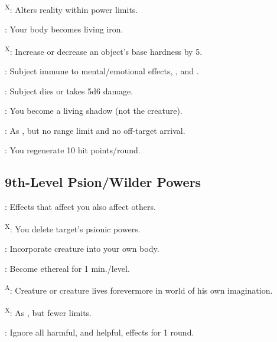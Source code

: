 \textsuperscript{X}: Alters reality within power limits.

: Your body becomes living iron.

\textsuperscript{X}: Increase or decrease an object's base hardness by 5.

: Subject immune to mental/emotional effects, , and .

: Subject dies or takes 5d6 damage.

: You become a living shadow (not the creature).

: As , but no range limit and no off-target arrival.

: You regenerate 10 hit points/round.




\subsection{9th-Level Psion/Wilder Powers}

: Effects that affect you also affect others.

\textsuperscript{X}: You delete target's psionic powers.

: Incorporate creature into your own body.

: Become ethereal for 1 min./level.

\textsuperscript{A}: Creature or creature lives forevermore in world of his own imagination.

\textsuperscript{X}: As , but fewer limits.

: Ignore all harmful, and helpful, effects for 1 round.